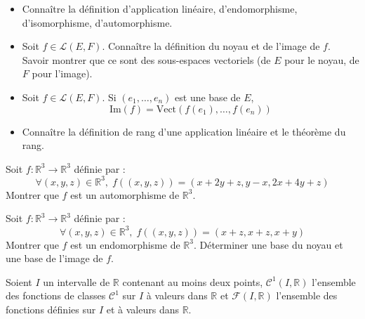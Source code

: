 \documentclass[a4paper,twoside,french,10pt]{VcCours}
\begin{document}
\begin{ptc}{}
	
\begin{itemize}
\item Connaître la définition d'application linéaire, d'endomorphisme, d'isomorphisme, d'automorphisme.
\item Soit $f \in \mathcal{L}(E,F)$. Connaître la définition du noyau et de l'image de $f$. Savoir montrer que ce sont des sous-espaces vectoriels (de $E$ pour le noyau, de $F$ pour l'image).
\item Soit $f \in \mathcal{L}(E,F)$. Si $(e_1, \ldots, e_n)$ est une base de $E$,
$$ \textrm{Im}(f) = \textrm{Vect}(f(e_1), \ldots, f(e_n))$$
\item Connaître la définition de rang d'une application linéaire et le théorème du rang.
\end{itemize} 
\end{ptc}
%

\medskip


\begin{Exercice}{}\end{Exercice} Soit $f : \mathbb{R}^3 \rightarrow \mathbb{R}^3$ définie par :
$$ \forall (x,y,z) \in \mathbb{R}^3, \; f((x,y,z))= (x+2y+z,y-x,2x+4y+z)$$
Montrer que $f$ est un automorphisme de $\mathbb{R}^3$.


\medskip

\begin{Exercice}{}\end{Exercice} Soit $f : \mathbb{R}^3 \rightarrow \mathbb{R}^3$ définie par :
$$ \forall (x,y,z) \in \mathbb{R}^3, \; f((x,y,z))= (x+z,x+z,x+y)$$
Montrer que $f$ est un endomorphisme de $\mathbb{R}^3$. Déterminer une base du noyau et une base de l'image de $f$.


\medskip

\begin{Exercice}{}\end{Exercice} Soient $I$ un intervalle de $\mathbb{R}$ contenant au moins deux points,  $\mathcal{C}^1(I, \mathbb{R})$ l'ensemble des fonctions de classes $\mathcal{C}^1$ sur $I$ à valeurs dans $\mathbb{R}$ et $\mathcal{F}(I, \mathbb{R})$ l'ensemble des fonctions définies sur $I$ et à valeurs dans $\mathbb{R}$. 
\end{document}
